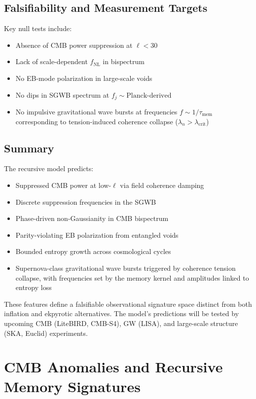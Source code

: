 \subsection{Falsifiability and Measurement Targets}

Key null tests include:
\begin{itemize}
    \item Absence of CMB power suppression at \( \ell < 30 \)
    \item Lack of scale-dependent \( f_{\text{NL}} \) in bispectrum
    \item No EB-mode polarization in large-scale voids
    \item No dips in SGWB spectrum at \( f_j \sim \text{Planck-derived} \)
    \item No impulsive gravitational wave bursts at frequencies \( f \sim 1/\tau_{\text{mem}} \) corresponding to tension-induced coherence collapse (\( \lambda_n > \lambda_{\text{crit}} \))
\end{itemize}

\subsection{Summary}

The recursive model predicts:
\begin{itemize}
    \item Suppressed CMB power at low-\( \ell \) via field coherence damping
    \item Discrete suppression frequencies in the SGWB
    \item Phase-driven non-Gaussianity in CMB bispectrum
    \item Parity-violating EB polarization from entangled voids
    \item Bounded entropy growth across cosmological cycles
    \item Supernova-class gravitational wave bursts triggered by coherence tension collapse, with frequencies set by the memory kernel and amplitudes linked to entropy loss
\end{itemize}

These features define a falsifiable observational signature space distinct from both inflation and ekpyrotic alternatives. The model’s predictions will be tested by upcoming CMB (LiteBIRD, CMB-S4), GW (LISA), and large-scale structure (SKA, Euclid) experiments.

\section*{CMB Anomalies and Recursive Memory Signatures}
\label{sec:cmb-anomalies}

